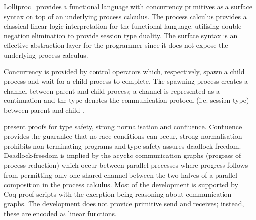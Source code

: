 Lolliproc~\cite{Mazurak:2010:LCC} provides a functional language with
concurrency primitives as a surface syntax on top of an underlying process
calculus. The process calculus provides a classical linear logic
interpretation for the functional language, utilising double negation
elimination to provide session type duality. The surface syntax is an
effective abstraction layer for the programmer since it does not expose the
underlying process calculus.

Concurrency is provided by control operators which, respectively, spawn a
child process and wait for a child process to complete. The spawning process
creates a channel between parent and child process; a channel is represented
as a continuation and the type denotes the communication protocol
(i.e. session type) between parent and child .

\citeauthor{Mazurak:2010:LCC} present proofs for type safety, strong
normalisation and confluence. Confluence provides the guarantee that no race
conditions can occur, strong normalisation prohibits non-terminating programs
and type safety assures deadlock-freedom. Deadlock-freedom is implied by the
acyclic communication graphs (progress of process reduction) which occur
between parallel processes where progress follows from permitting only one
shared channel between the two halves of a parallel composition in the process
calculus. Most of the development is supported by Coq proof scripts with the
exception being reasoning about communication graphs. The development does not
provide primitive send and receives; instead, these are encoded as linear
functions.





